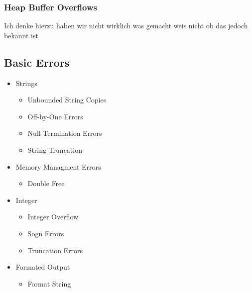 \documentclass[a4paper, 12pt]{article}
\begin{document}
\subsubsection{Heap Buffer Overflows}
Ich denke hierzu haben wir nicht wirklich was gemacht weis nicht ob das jedoch bekannt ist

\subsection{Basic Errors}
\begin{itemize}
\item Strings
\begin{itemize}
\item Unbounded String Copies
\item Off-by-One Errors
\item Null-Termination Errors
\item String Truncation
\end{itemize}
\item Memory Managment Errors
\begin{itemize}
\item Double Free
\end{itemize}
\item Integer
\begin{itemize}
\item Integer Overflow
\item Sogn Errors
\item Truncation Errors
\end{itemize}
\item Formated Output
\begin{itemize}
\item Format String
\end{itemize}
\end{itemize} 
\end{document}
